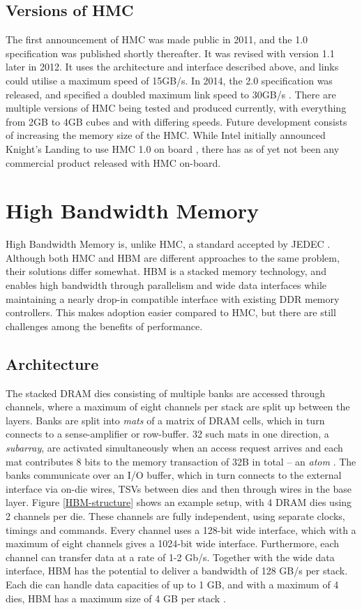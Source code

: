 \subsection{Versions of HMC}
The first announcement of HMC was made public in 2011, and the 1.0 specification was published shortly thereafter. It was revised with version 1.1 later in 2012. It uses the architecture and interface described above, and links could utilise a maximum speed of 15GB/s. In 2014, the 2.0 specification was released, and specified a doubled maximum link speed to 30GB/s \cite{hybrid2014hybrid}. There are multiple versions of HMC being tested and produced currently, with everything from 2GB to 4GB cubes and with differing speeds. Future development consists of increasing the memory size of the HMC. While Intel initially announced Knight's Landing to use HMC 1.0 on board \cite{micron2014ikl}, there has as of yet not been any commercial product released with HMC on-board.


\section{High Bandwidth Memory}
High Bandwidth Memory is, unlike HMC, a standard accepted by JEDEC \cite{standard2013high}. Although both HMC and HBM are different approaches to the same problem, their solutions differ somewhat. HBM is a stacked memory technology, and enables high bandwidth through parallelism and wide data interfaces while maintaining a nearly drop-in compatible interface with existing DDR memory controllers. This makes adoption easier compared to HMC, but there are still challenges among the benefits of performance.

\subsection{Architecture}
The stacked DRAM dies consisting of multiple banks are accessed through channels, where a maximum of eight channels per stack are split up between the layers. Banks are split into \emph{mats} of a matrix of DRAM cells, which in turn connects to a sense-amplifier or row-buffer. 32 such mats in one direction, a \emph{subarray}, are activated simultaneously when an access request arrives and each mat contributes 8 bits to the memory transaction of 32B in total -- an \emph{atom} \cite{7920815}. The banks communicate over an I/O buffer, which in turn connects to the external interface via on-die wires, TSVs between dies and then through wires in the base layer. Figure \ref{HBM-structure} shows an example setup, with 4 DRAM dies using 2 channels per die. These channels are fully independent, using separate clocks, timings and commands. Every channel uses a 128-bit wide interface, which with a maximum of eight channels gives a 1024-bit wide interface. Furthermore, each channel can transfer data at a rate of 1-2 Gb/s. Together with the wide data interface, HBM has the potential to deliver a bandwidth of 128 GB/s per stack. Each die can handle data capacities of up to 1 GB, and with a maximum of 4 dies, HBM has a maximum size of 4 GB per stack \cite{7478812}.
\bigskip

